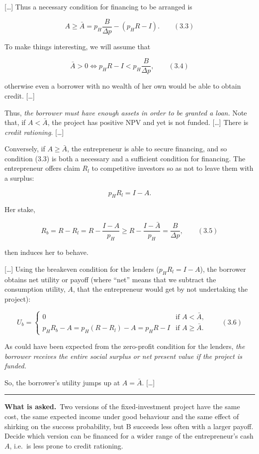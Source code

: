 \documentclass[11pt,a4paper]{article}
\newcommand{\asked}{\par\medskip\noindent\textbf{What is asked.}~}
\newcommand{\stmtend}{\par\endgroup\nopagebreak\noindent\rule{\linewidth}{0.4pt}\par\medskip}
\begin{document}
{[}\ldots{]} Thus a necessary condition for financing to be arranged is

\[A \geqslant \bar A = p_H \frac{B}{\Delta p} - (p_H R - I). \qquad (3.3)\]

To make things interesting, we will assume that

\[\bar A > 0 \iff p_H R - I < p_H \frac{B}{\Delta p}, \qquad (3.4)\]

otherwise even a borrower with no wealth of her own would be able to obtain credit. {[}\ldots{]}

Thus, \emph{the borrower must have enough assets in order to be granted a loan.} Note that, if
\(A < \bar A\), the project has positive NPV and yet is not funded. {[}\ldots{]} There is
\emph{credit rationing}. {[}\ldots{]}

Conversely, if \(A \geqslant \bar A\), the entrepreneur is able to secure financing, and so
condition (3.3) is both a necessary and a sufficient condition for financing. The entrepreneur
offers claim \(R_l\) to competitive investors so as not to leave them with a surplus:

\[p_H R_l = I - A.\]

Her stake,

\[R_b = R - R_l = R - \frac{I - A}{p_H} \geqslant R - \frac{I - \bar A}{p_H} = \frac{B}{\Delta p}, \qquad (3.5)\]

then induces her to behave.

{[}\ldots{]} Using the breakeven condition for the lenders (\(p_H R_l = I - A\)), the borrower
obtains net utility or payoff (where ``net'' means that we subtract the consumption utility, \(A\),
that the entrepreneur would get by not undertaking the project):

\[U_b = \begin{cases} 0 & \text{if } A < \bar A, \\ p_H R_b - A = p_H(R - R_l) - A = p_H R - I & \text{if } A \geqslant \bar A. \end{cases} \qquad (3.6)\]

As could have been expected from the zero-profit condition for the lenders, \emph{the borrower
receives the entire social surplus or net present value if the project is funded.}

So, the borrower's utility jumps up at \(A = \bar A\). {[}\ldots{]}
\stmtend

\asked Two versions of the fixed-investment project have the same cost, the same expected income
under good behaviour and the same effect of shirking on the success probability, but B succeeds less
often with a larger payoff. Decide which version can be financed for a wider range of the
entrepreneur's cash $A$, i.e.\ is less prone to credit rationing.
\end{document}
